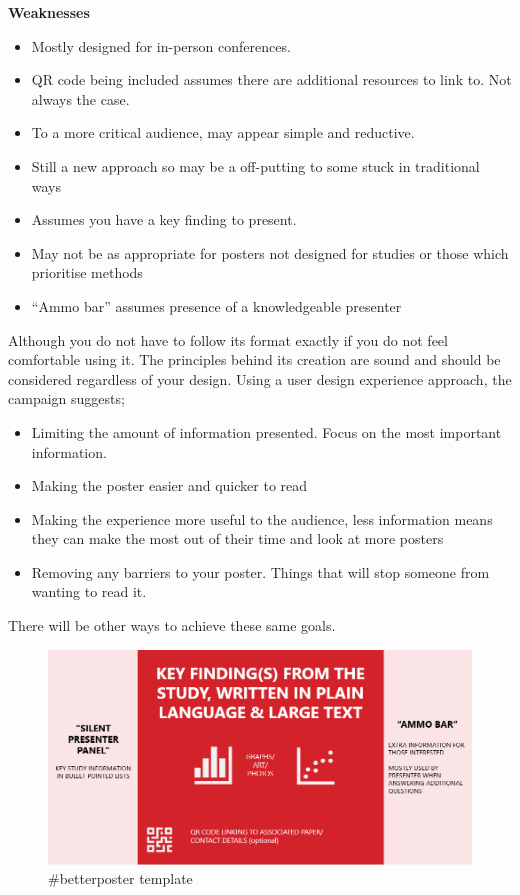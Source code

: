 \documentclass[
  titlepage]{book}
\providecommand{\tightlist}{%
  \setlength{\itemsep}{0pt}\setlength{\parskip}{0pt}}
\begin{document}
\textbf{Weaknesses}

\begin{itemize}
\tightlist
\item
  Mostly designed for in-person conferences.
\item
  QR code being included assumes there are additional resources to link to. Not always the case.
\item
  To a more critical audience, may appear simple and reductive.
\item
  Still a new approach so may be a off-putting to some stuck in traditional ways
\item
  Assumes you have a key finding to present.
\item
  May not be as appropriate for posters not designed for studies or those which prioritise methods
\item
  ``Ammo bar'' assumes presence of a knowledgeable presenter
\end{itemize}

Although you do not have to follow its format exactly if you do not feel comfortable using it. The principles behind its creation are sound and should be considered regardless of your design. Using a user design experience approach, the campaign suggests;

\begin{itemize}
\tightlist
\item
  Limiting the amount of information presented. Focus on the most important information.
\item
  Making the poster easier and quicker to read
\item
  Making the experience more useful to the audience, less information means they can make the most out of their time and look at more posters
\item
  Removing any barriers to your poster. Things that will stop someone from wanting to read it.
\end{itemize}

There will be other ways to achieve these same goals.

\begin{figure}
\centering
\includegraphics{img/Better Poster template.png}
\caption{\#betterposter template}
\end{figure}
\end{document}
